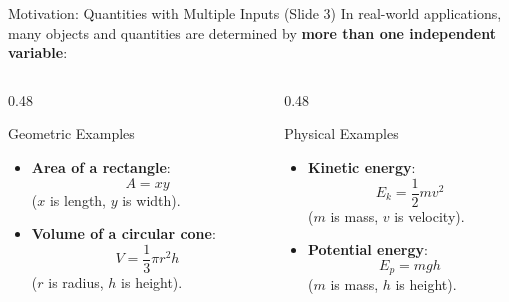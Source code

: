 \documentclass[aspectratio=169,10pt]{beamer}
\begin{document}
\begin{frame}{Motivation: Quantities with Multiple Inputs (Slide 3)}
  In real-world applications, many objects and quantities are determined by \textbf{more than one independent variable}:

  \vspace{0.2em}
  \begin{columns}[T]
    \begin{column}{0.48\textwidth}
      \begin{block}{Geometric Examples}
        \small
        \begin{itemize}
          \item \textbf{Area of a rectangle}:
          \[
            A = xy
          \]
          ($x$ is length, $y$ is width).
          
          \vspace{0.1em}
          \item \textbf{Volume of a circular cone}:
          \[
            V = \frac{1}{3}\pi r^2 h
          \]
          ($r$ is radius, $h$ is height).
        \end{itemize}
      \end{block}
    \end{column}

    \begin{column}{0.48\textwidth}
      \begin{block}{Physical Examples}
        \small
        \begin{itemize}
          \item \textbf{Kinetic energy}:
          \[
            E_k = \frac{1}{2}m v^2
          \]
          ($m$ is mass, $v$ is velocity).

          \vspace{0.1em}
          \item \textbf{Potential energy}:
          \[
            E_p = mgh
          \]
          ($m$ is mass, $h$ is height).
        \end{itemize}
      \end{block}
    \end{column}
  \end{columns}
\end{frame}
\end{document}
